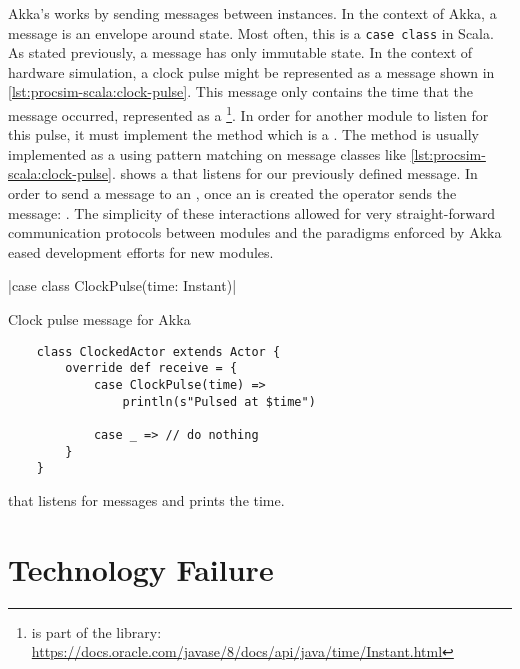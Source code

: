 Akka's \akkaActor{} works by sending messages between \akkaActor{} instances. In the context of Akka, a message is an envelope around state. Most often, this is a \texttt{case class} in Scala. As stated previously, a message has only immutable state. In the context of hardware simulation, a clock pulse might be represented as a message shown in \cref{lst:procsim-scala:clock-pulse}. This message only contains the time that the message occurred, represented as a \footnote{ is part of the  library: \url{https://docs.oracle.com/javase/8/docs/api/java/time/Instant.html}}. In order for another module to listen for this pulse, it must implement the  method which is a . The  method is usually implemented as a  using pattern matching \cite{Scala-PatternMatching} on message classes like \cref{lst:procsim-scala:clock-pulse}.  shows a \akkaActor{} that listens for our previously defined  message. In order to send a message to an \akkaActor{}, once an \akkaActor{} is created the \scalainline{!} operator sends the message: . The simplicity of these interactions allowed for very straight-forward communication protocols between modules and the paradigms enforced by Akka eased development efforts for new modules. 

\begin{listing}
    |case class ClockPulse(time: Instant)|
    \caption{Clock pulse message for Akka}
    \label{lst:procsim-scala:clock-pulse}
\end{listing}

\begin{listing}
    \begin{verbatim}
    class ClockedActor extends Actor {
        override def receive = {
            case ClockPulse(time) => 
                println(s"Pulsed at $time")
            
            case _ => // do nothing
        }
    }
    \end{verbatim}
    \caption{\akkaActor{} that listens for  messages and prints the time.}
    \label{lst:procsim-scala:clock-pulse-actor}
\end{listing}


\section{Technology Failure}

